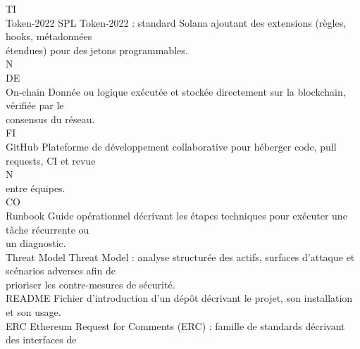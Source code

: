 \documentclass[12pt,landscape,a4paper]{article}
\begin{document}
\vspace{0.5em}
TI\\
Token-2022                              SPL Token-2022 : standard Solana ajoutant des extensions (règles, hooks, métadonnées\\
étendues) pour des jetons programmables.\\
\vspace{0.5em}
\vspace{0.5em}
\vspace{0.5em}
\vspace{0.5em}
N\\
DE\\
On-chain                                Donnée ou logique exécutée et stockée directement sur la blockchain, vérifiée par le\\
consensus du réseau.\\
\vspace{0.5em}
\vspace{0.5em}
\vspace{0.5em}
\vspace{0.5em}
FI\\
GitHub                                  Plateforme de développement collaborative pour héberger code, pull requests, CI et revue\\
\vspace{0.5em}
\vspace{0.5em}
\vspace{0.5em}
N\\
entre équipes.\\
CO\\
Runbook                                 Guide opérationnel décrivant les étapes techniques pour exécuter une tâche récurrente ou\\
un diagnostic.\\
\vspace{0.5em}
Threat Model                            Threat Model : analyse structurée des actifs, surfaces d’attaque et scénarios adverses afin de\\
prioriser les contre-mesures de sécurité.\\
\vspace{0.5em}
README                                  Fichier d’introduction d’un dépôt décrivant le projet, son installation et son usage.\\
\vspace{0.5em}
ERC                                     Ethereum Request for Comments (ERC) : famille de standards décrivant des interfaces de\\
\end{document}
